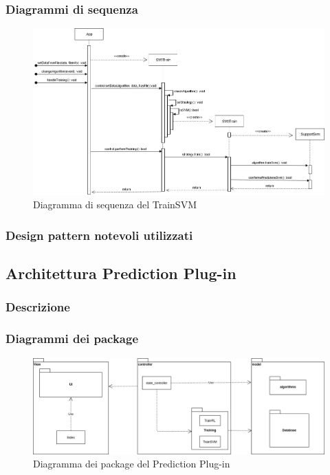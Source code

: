 \subsubsection{Diagrammi di sequenza}
\begin{figure}[H]
\centering
\includegraphics[scale=0.45]{../../Diagrams/Sequence_diagrams/trainSVM.png}
\caption{Diagramma di sequenza del TrainSVM}
\end{figure}

\subsubsection{Design pattern notevoli utilizzati}


\subsection{Architettura Prediction Plug-in}

\subsubsection{Descrizione}

\subsubsection{Diagrammi dei package}
\begin{figure}[H]
\centering
\includegraphics[scale=0.40]{../../Diagrams/Package_diagrams/plugin_design_pattern.png}
\caption{Diagramma dei package del Prediction Plug-in}
\end{figure}

